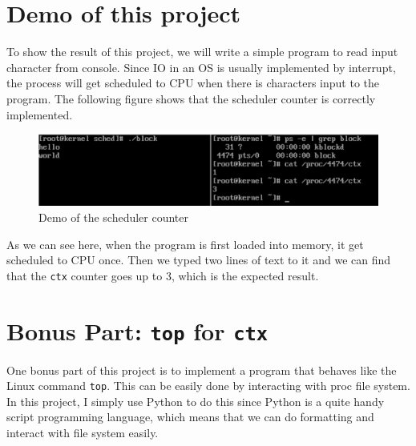 \documentclass{article}
\begin{document}
\section{Demo of this project}
To show the result of this project, we will write a simple program to read input character from console. Since IO in an OS is usually implemented by interrupt, the process will get scheduled to CPU when there is characters input to the program. The following figure shows that the scheduler counter is correctly implemented.
\begin{figure}[H]
\centering
\includegraphics[width=12cm]{sched.png}
\caption{Demo of the scheduler counter}
\end{figure}
As we can see here, when the program is first loaded into memory, it get scheduled to CPU once. Then we typed two lines of text to it and we can find that the {\tt ctx} counter goes up to 3, which is the expected result.

\section{Bonus Part: {\tt top} for {\tt ctx}}
One bonus part of this project is to implement a program that behaves like the Linux command {\tt top}. This can be easily done by interacting with proc file system. In this project, I simply use Python to do this since Python is a quite handy script programming language, which means that we can do formatting and interact with file system easily.
\end{document}
